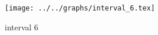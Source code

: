 \begin{figure}[h] \centering\texttt{[image: ../../graphs/interval\_6.tex]}\caption{interval 6}\label{gr:interval_6} \end{figure}
